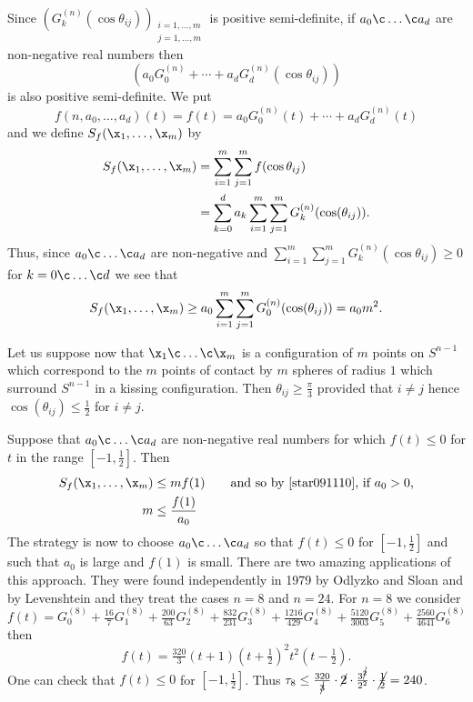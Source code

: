 Since $(G_k^{(n)}(\cos\theta_{ij}))_{\substack{i=1,\dotsc,m\\j=1,\dotsc,m}}$ is positive semi-definite, if $a_0\c \dotsc\c a_d$ are non-negative real numbers then
\[ (a_0G_0^{(n)}+\dotsb+a_dG_d^{(n)}(\cos\theta_{ij})) \]
is also positive semi-definite.  We put
\[ f(n,a_0,\dotsc,a_d)(t) = f(t) = a_0G_0^{(n)}(t) + \dotsb + a_dG_d^{(n)}(t) \]
and we define $S_f(\x_1,\dotsc,\x_m)$ by
\begin{align*}
S_f(\x_1,\dotsc,\x_m) &= \sum_{i=1}^m\sum_{j=1}^m f(\cos\theta_{ij}) \\
&= \sum_{k=0}^d a_k \sum_{i=1}^m\sum_{j=1}^m G_k^{(n)}(\cos(\theta_{ij})) .
\end{align*}
Thus, since $a_0\c \dotsc\c a_d$ are non-negative and $\sum_{i=1}^m\sum_{j=1}^m G_k^{(n)}(\cos\theta_{ij})\geq0$ for $k=0\c \dotsc\c d$ we see that
\begin{equation} S_f(\x_1,\dotsc,\x_m) \geq a_0 \sum_{i=1}^m\sum_{j=1}^m G_0^{(n)}(\cos(\theta_{ij})) = a_0 m^2 \label{star091110} . \end{equation}

Let us suppose now that $\x_1\c \dotsc\c \x_m$ is a configuration of $m$ points on $S^{n-1}$ which correspond to the $m$ points of contact by $m$ spheres of radius $1$ which surround $S^{n-1}$ in a kissing configuration.  Then $\theta_{ij}\geq\frac\pi3$ provided that $i\neq j$ hence $\cos(\theta_{ij})\leq\frac12$ for $i\neq j$.

Suppose that $a_0\c \dotsc\c a_d$ are non-negative real numbers for which $f(t)\leq0$ for $t$ in the range $[-1,\frac12]$.  Then
\begin{align*}
S_f(\x_1,\dotsc,\x_m) &\leq m f(1) \qquad\text{and so by~\eqref{star091110}, if $a_0>0$,} \\
m &\leq \frac{f(1)}{a_0}
\end{align*}%
The strategy is now to choose $a_0\c \dotsc\c a_d$ so that $f(t)\leq0$ for $[-1,\frac12]$ and such that $a_0$ is large and $f(1)$ is small.  There are two amazing applications of this approach.  They were found independently in 1979 by Odlyzko and Sloan and by Levenshtein and they treat the cases $n=8$ and $n=24$. %
For $n=8$ we consider
\[ f(t) = G_0^{(8)} + \tfrac{16}{7}G_1^{(8)} + \tfrac{200}{63}G_2^{(8)} + \tfrac{832}{231}G_3^{(8)} + \tfrac{1216}{429}G_4^{(8)} + \tfrac{5120}{3003}G_5^{(8)} + \tfrac{2560}{4641}G_6^{(8)} \]
then
\[ f(t) = \tfrac{320}{3}(t+1)(t+\tfrac12)^2t^2(t-\tfrac12) . \]
One can check that $f(t)\leq0$ for $[-1,\frac12]$.  Thus $\tau_8\leq\frac{320}{\cancel3}\cdot\cancel2\cdot\frac{3^{\cancel2}}{2^2}\cdot\cancel{\frac{1}{2}}=240$.

